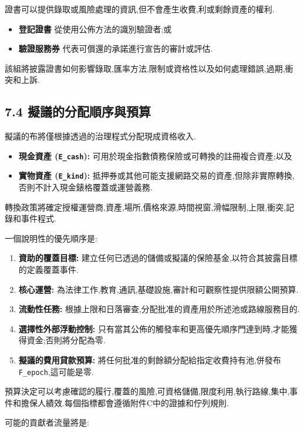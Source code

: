 \documentclass[11pt]{article}
\begin{document}
證書可以提供錄取或風險處理的資訊,但不會產生收費,利或剩餘資產的權利.

\begin{itemize}[leftmargin=*]
\item \textbf{登記證書} 從使用公佈方法的識別驗證者;或
\item \textbf{驗證服務券} 代表可償還的承諾進行宣告的審計或評估.
\end{itemize}
該組將披露證書如何影響錄取,匯率方法,限制或資格性以及如何處理錯誤,過期,衝突和上訴.

\subsection*{7.4 擬議的分配順序與預算}

擬議的布將僅根據透過的治理程式分配現成資格收入.

\begin{itemize}[leftmargin=*]
\item \textbf{現金資產 (\texttt{E\_cash}):} 可用於現金指數債務保險或可轉換的註冊複合資產;以及
\item \textbf{實物資產 (\texttt{E\_kind}):} 抵押券或其他可能支援網路交易的資產,但除非實際轉換,否則不計入現金錶格覆蓋或運營義務.
\end{itemize}
轉換政策將確定授權運營商,資產,場所,價格來源,時間視窗,滑幅限制,上限,衝突,記錄和事件程式.

一個說明性的優先順序是:

\begin{enumerate}[leftmargin=*]
\item \textbf{資助的覆蓋目標:} 建立任何已透過的儲備或擬議的保險基金,以符合其披露目標的定義覆蓋事件.
\item \textbf{核心運營:} 為法律工作,教育,通訊,基礎設施,審計和可觀察性提供限額公開預算.
\item \textbf{流動性任務:} 根據上限和日落審查,分配批准的資產用於所述池或路線服務目的.
\item \textbf{選擇性外部浮動控制:} 只有當其公佈的觸發率和更高優先順序門達到時,才能獲得資金;否則將分配為零.
\item \textbf{擬議的費用貸款預算:} 將任何批准的剩餘額分配給指定收費持有池,併發布 \texttt{F\_epoch},這可能是零.
\end{enumerate}
預算決定可以考慮確認的履行,覆蓋的風險,可資格儲備,限度利用,執行路線,集中,事件和擔保人績效.每個指標都會遵循附件C中的證據和佇列規則.

可能的貢獻者流量將是:
\end{document}
